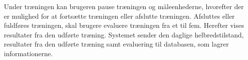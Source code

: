Under træningen kan brugeren pause træningen og måleenhederne, hvorefter der er mulighed for at fortsætte træningen eller afslutte træningen. Afsluttes eller fuldføres træningen, skal brugere evaluere træningen fra et til fem. Herefter vises resultater fra den udførte træning. Systemet sender den daglige helbredstilstand, resultater fra den udførte træning samt evaluering til databasen, som lagrer informationerne. 
